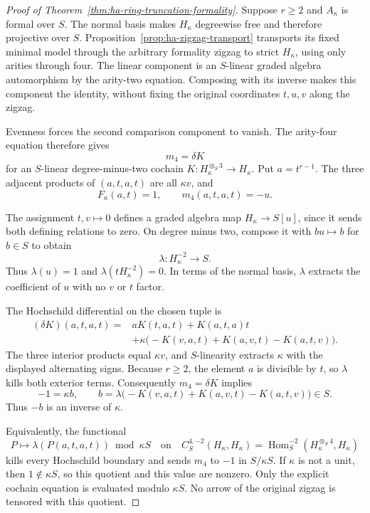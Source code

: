 \begin{proof}[Proof of Theorem~\ref{thm:ha-ring-truncation-formality}]
Suppose $r\geq2$ and $A_\kappa$ is formal over $S$.
The normal basis makes $H_\kappa$ degreewise free and therefore
projective over $S$.
Proposition~\ref{prop:ha-zigzag-transport} transports its fixed
minimal model through the arbitrary formality zigzag to strict
$H_\kappa$, using only arities through four.
The linear component is an $S$-linear graded algebra automorphism
by the arity-two equation.
Composing with its inverse makes this component the identity,
without fixing the original coordinates $t,u,v$ along the zigzag.

Evenness forces the second comparison component to vanish.
The arity-four equation therefore gives
\[
 m_4=\delta K
\]
for an $S$-linear degree-minus-two cochain
$K:H_\kappa^{\otimes_S3}\to H_\kappa$.
Put $a=t^{r-1}$.
The three adjacent products of $(a,t,a,t)$ are all $\kappa v$, and
\[
 F_\kappa(a,t)=1,\qquad m_4(a,t,a,t)=-u.
\]

The assignment $t,v\mapsto0$ defines a graded algebra map
$H_\kappa\to S[u]$, since it sends both defining relations to zero.
On degree minus two, compose it with $bu\mapsto b$ for $b\in S$
to obtain
\[
 \lambda:H_\kappa^{-2}\longrightarrow S.
\]
Thus $\lambda(u)=1$ and $\lambda(tH_\kappa^{-2})=0$.
In terms of the normal basis, $\lambda$ extracts the coefficient
of $u$ with no $v$ or $t$ factor.

The Hochschild differential on the chosen tuple is
\[
 \begin{split}
 (\delta K)(a,t,a,t)
 ={}&aK(t,a,t)+K(a,t,a)t\\
 &+\kappa\bigl(-K(v,a,t)+K(a,v,t)-K(a,t,v)\bigr).
 \end{split}
\]
The three interior products equal $\kappa v$, and $S$-linearity
extracts $\kappa$ with the displayed alternating signs.
Because $r\geq2$, the element $a$ is divisible by $t$, so
$\lambda$ kills both exterior terms.
Consequently $m_4=\delta K$ implies
\[
 -1=\kappa b,\qquad
 b=\lambda\bigl(-K(v,a,t)+K(a,v,t)-K(a,t,v)\bigr)\in S.
\]
Thus $-b$ is an inverse of $\kappa$.

Equivalently, the functional
\[
 P\longmapsto\lambda(P(a,t,a,t))\bmod\kappa S
 \quad\text{on}\quad
 C_S^{4,-2}(H_\kappa,H_\kappa)
 =\operatorname{Hom}_S^{-2}(H_\kappa^{\otimes_S4},H_\kappa)
\]
kills every Hochschild boundary and sends $m_4$ to $-1$ in
$S/\kappa S$.
If $\kappa$ is not a unit, then $1\notin\kappa S$, so this quotient
and this value are nonzero.
Only the explicit cochain equation is evaluated modulo $\kappa S$.
No arrow of the original zigzag is tensored with this quotient.


\end{proof}
